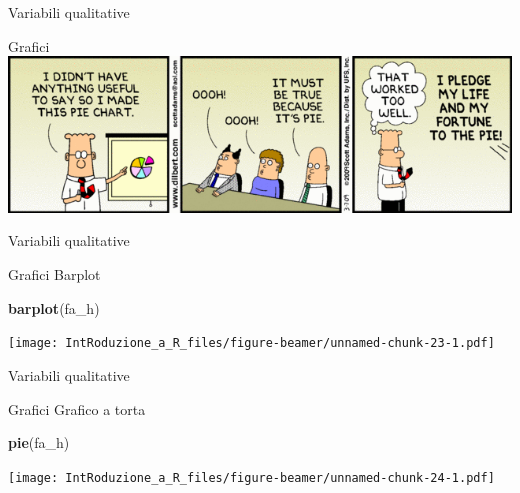 \documentclass[
  ignorenonframetext,
]{beamer}
\newenvironment{Shaded}{\begin{snugshade}}{\end{snugshade}}
\newcommand{\KeywordTok}[1]{\textcolor[rgb]{0.13,0.29,0.53}{\textbf{#1}}}
\newcommand{\NormalTok}[1]{#1}
\begin{document}
\begin{frame}{Variabili qualitative}
\protect\hypertarget{variabili-qualitative-2}{}
\begin{block}{Grafici}
\protect\hypertarget{grafici}{}
\includegraphics[width=1\textwidth,height=\textheight]{Images/pie1.gif}
\end{block}
\end{frame}

\begin{frame}[fragile]{Variabili qualitative}
\protect\hypertarget{variabili-qualitative-3}{}
\begin{block}{Grafici}
\protect\hypertarget{grafici-1}{}
Barplot

\begin{Shaded}
\begin{Highlighting}[]
\KeywordTok{barplot}\NormalTok{(fa\_h)}
\end{Highlighting}
\end{Shaded}

\texttt{[image: IntRoduzione\_a\_R\_files/figure-beamer/unnamed-chunk-23-1.pdf]}
\end{block}
\end{frame}

\begin{frame}[fragile]{Variabili qualitative}
\protect\hypertarget{variabili-qualitative-4}{}
\begin{block}{Grafici}
\protect\hypertarget{grafici-2}{}
Grafico a torta

\begin{Shaded}
\begin{Highlighting}[]
\KeywordTok{pie}\NormalTok{(fa\_h)}
\end{Highlighting}
\end{Shaded}

\texttt{[image: IntRoduzione\_a\_R\_files/figure-beamer/unnamed-chunk-24-1.pdf]}
\end{block}
\end{frame}
\end{document}
